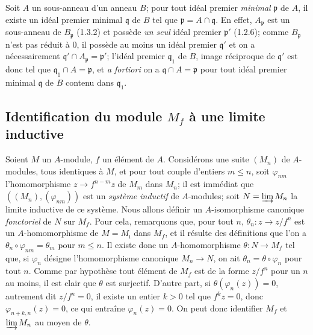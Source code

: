 \begin{env}[1.5.8]
\label{0.1.5.8-fr}
Soit $A$ un sous-anneau d'un anneau $B$; pour tout idéal premier
\emph{minimal} $\mathfrak p$ de $A$, il existe un idéal premier minimal
$\mathfrak q$ de $B$ tel que $\mathfrak p=A\cap\mathfrak q$. En effet,
$A_{\mathfrak p}$ est un sous-anneau de $B_{\mathfrak p}$ (1.3.2) et possède
\emph{un seul} idéal premier $\mathfrak p'$ (1.2.6); comme $B_{\mathfrak p}$ n'est pas
réduit à $0$, il possède au moins un idéal premier $\mathfrak q'$ et on a
nécessairement $\mathfrak q'\cap A_{\mathfrak p}=\mathfrak p'$; l'idéal premier
$\mathfrak q_1$ de $B$, image réciproque de $\mathfrak q'$ est donc tel que
$\mathfrak q_1\cap A=\mathfrak p$, et \emph{a fortiori} on a
$\mathfrak q\cap A=\mathfrak p$ pour tout idéal premier minimal $\mathfrak q$
de $B$ contenu dans $\mathfrak q_1$.
\end{env}

\subsection{Identification du module $M_f$ à une limite inductive}
\label{subsection:0.1.6-fr}

\begin{env}[1.6.1]
\label{0.1.6.1-fr}
Soient $M$ un $A$-module, $f$ un élément de $A$. Considérons une suite
$(M_n)$ de $A$-modules, tous identiques à $M$, et pour tout couple d'entiers
$m\leq n$, soit $\varphi_{nm}$ l'homomorphisme $z\to f^{n-m}z$ de $M_m$
dans $M_n$; il est immédiat que $((M_n),(\varphi_{nm}))$ est un \emph{système
inductif} de $A$-modules; soit $N=\varinjlim M_n$ la limite inductive de ce
système. Nous allons définir un $A$-isomorphisme canonique \emph{fonctoriel} de
$N$ sur $M_f$. Pour cela, remarquons que, pour tout $n$,
$\theta_n:z\to z/f^n$ est un $A$-homomorphisme de $M=M_{\imath}$ dans $M_f$, et
il résulte des définitions que l'on a $\theta_n\circ\varphi_{nm}=\theta_m$ pour
$m\leq n$. Il existe donc un $A$-homomorphisme $\theta:N\to M_f$ tel que, si
$\varphi_n$ désigne l'homomorphisme canonique $M_n\to N$, on ait
$\theta_n=\theta\circ\varphi_n$ pour tout $n$. Comme par hypothèse tout élément
de $M_f$ est de la forme $z/f^n$ pour un $n$ au moins, il est clair que
$\theta$ est surjectif. D'autre part, si $\theta(\varphi_n(z))=0$, autrement dit
$z/f^n=0$, il existe un entier $k>0$ tel que $f^kz=0$, donc
$\varphi_{n+k,n}(z)=0$, ce qui entraîne $\varphi_n(z)=0$. On peut donc
identifier $M_f$ et $\varinjlim M_n$ au moyen de $\theta$.
\end{env}

